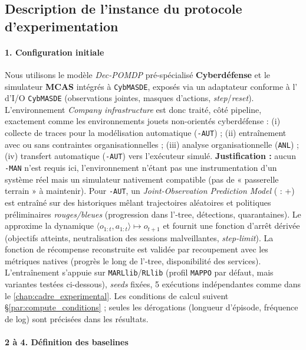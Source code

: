 \subsection{Description de l'instance du protocole d'experimentation}

\paragraph{1. Configuration initiale}

Nous utilisons le modèle \emph{Dec-POMDP} pré-spécialisé \textbf{Cyberdéfense} et le simulateur \textbf{MCAS} intégrés à \texttt{CybMASDE}, exposés via un adaptateur  conforme à l’ d’I/O \texttt{CybMASDE} (observations jointes, masques d’actions, \emph{step}/\emph{reset}). L’environnement \emph{Company infrastructure} est donc traité, côté pipeline, exactement comme les environnements jouets non-orientés cyberdéfense : (i) collecte de traces pour la modélisation automatique (\texttt{-AUT}) ; (ii) entraînement  avec ou sans contraintes organisationnelles ; (iii) analyse organisationnelle (\texttt{ANL}) ; (iv) transfert automatique (\texttt{-AUT}) vers l’exécuteur simulé.
\textbf{Justification :} aucun \texttt{-MAN} n’est requis ici, l’environnement n’étant pas une instrumentation d’un système réel mais un simulateur nativement compatible (pas de « passerelle terrain » à maintenir).
Pour \texttt{-AUT}, un \emph{Joint-Observation Prediction Model} ( : +) est entraîné sur des historiques mêlant trajectoires aléatoires et politiques préliminaires \emph{rouges/bleues} (progression dans l’-tree, détections, quarantaines). Le  approxime la dynamique $\langle o_{1:t},a_{1:t} \rangle \mapsto o_{t+1}$ et fournit une fonction d’arrêt dérivée (objectifs atteints, neutralisation des sessions malveillantes, \emph{step-limit}). La fonction de récompense reconstruite est validée par recoupement avec les métriques natives (progrès le long de l’-tree, disponibilité des services). L’entraînement s’appuie sur \texttt{MARLlib}/\texttt{RLlib} (profil \texttt{MAPPO} par défaut, mais variantes testées ci-dessous), \emph{seeds} fixées, 5 exécutions indépendantes comme dans le \autoref{chap:cadre_experimental}. Les conditions de calcul suivent \S\ref{par:compute_conditions} ; seules les dérogations (longueur d’épisode, fréquence de log) sont précisées dans les résultats.

\paragraph{2 à 4. Définition des baselines}

